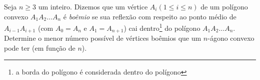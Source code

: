 Seja $n\geq 3$ um inteiro. Dizemos que um vértice $A_i (1\leq i\leq n)$ de um polígono convexo $A_1A_2 \dots A_n$ é \emph{boêmio} se sua reflexão com respeito ao ponto médio de $A_{i-1}A_{i+1}$ (com $A_0=A_n$ e $A_1=A_{n+1}$) cai dentro\footnote{a borda do polígono é considerada dentro do polígono} do polígono $A_1A_2\dots A_n$. Determine o menor número possível de vértices boêmios que um $n$-ágono convexo pode ter (em função de $n$).
